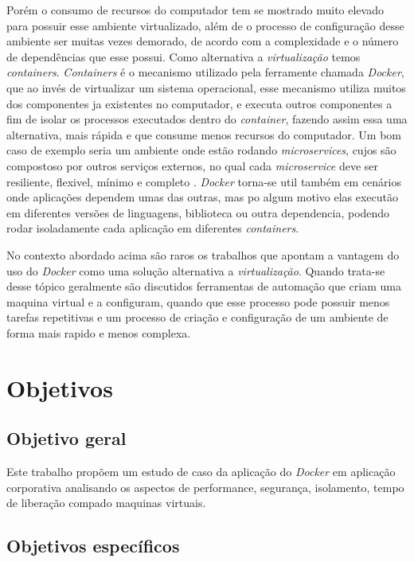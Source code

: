 \documentclass[11pt,a4paper]{article}
\begin{document}
Porém o consumo de recursos do computador tem se mostrado muito elevado para possuir esse ambiente virtualizado,
além de o processo de configuração desse ambiente ser muitas vezes demorado, de acordo com a complexidade e
o número de dependências que esse possui. Como alternativa a \textit{virtualização} temos \textit{containers}.
\textit{Containers} é o mecanismo utilizado pela ferramente chamada \textit{Docker}, que ao invés de virtualizar
um sistema operacional, esse mecanismo utiliza muitos dos componentes ja existentes no computador, e executa
outros componentes a fim de isolar os processos executados dentro do \textit{container}\cite{TW_docker_for_builds},
fazendo assim essa uma alternativa, mais rápida e que consume menos recursos do computador\cite{DZone_CD_guide_v3}.
Um bom caso de exemplo seria um ambiente onde estão rodando \textit{microservices}, cujos são compostoso por
outros serviços externos, no qual cada \textit{microservice} deve ser resiliente, flexivel, mínimo e completo
\cite{Bugwadia_arch_constrains}. \textit{Docker} torna-se util também em cenários onde aplicações dependem umas
das outras, mas po algum motivo elas executão em diferentes versões de linguagens, biblioteca ou outra dependencia,
podendo rodar isoladamente cada aplicação em diferentes \textit{containers}\cite{Merkel_Docker}.

No contexto abordado acima são raros os trabalhos que apontam a vantagem do uso do \textit{Docker} como uma solução
alternativa a \textit{virtualização}\cite{Jafari_infra_as_a_code}. Quando trata-se desse tópico geralmente são
discutidos ferramentas de automação que criam uma maquina virtual e a configuram, quando que esse processo
pode possuir menos tarefas repetitivas e um processo de criação e configuração de um ambiente de forma mais
rapido e menos complexa.

\section{Objetivos}\label{sec:objetivos}

\subsection{Objetivo geral}

Este trabalho propõem um estudo de caso da aplicação do \textit{Docker} em aplicação corporativa analisando os aspectos
de performance, segurança, isolamento, tempo de liberação compado maquinas virtuais.

\subsection{Objetivos específicos}\label{sec:objetivos_especificos}
\end{document}
